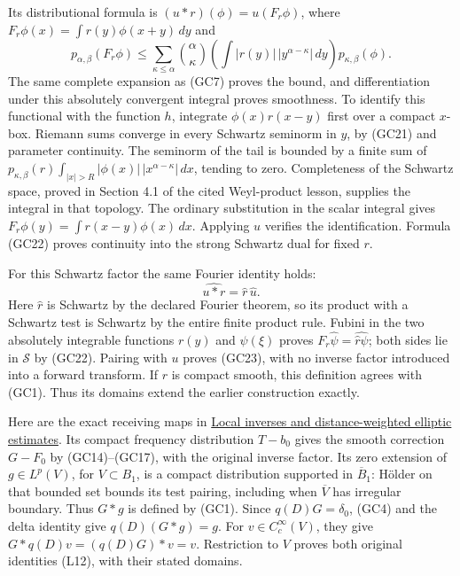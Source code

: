 \documentclass[
  11pt,
]{article}
\begin{document}
Its distributional formula is \((u*r)(\phi)=u(F_r\phi)\), where
\(F_r\phi(x)=\int r(y)\phi(x+y)\,dy\) and \[
 p_{\alpha,\beta}(F_r\phi)
 \leq\sum_{\kappa\leq\alpha}\binom{\alpha}{\kappa}
       \left(\int |r(y)|\,|y^{\alpha-\kappa}|\,dy\right)
                  p_{\kappa,\beta}(\phi).
 \tag{GC22}
\] The same complete expansion as (GC7) proves the bound, and
differentiation under this absolutely convergent integral proves
smoothness. To identify this functional with the function \(h\),
integrate \(\phi(x)r(x-y)\) first over a compact \(x\)-box. Riemann sums
converge in every Schwartz seminorm in \(y\), by (GC21) and parameter
continuity. The seminorm of the tail is bounded by a finite sum of
\(p_{\kappa,\beta}(r)\int_{|x|>R}|\phi(x)|\,|x^{\alpha-\kappa}|\,dx\),
tending to zero. Completeness of the Schwartz space, proved in Section
4.1 of the cited Weyl-product lesson, supplies the integral in that
topology. The ordinary substitution in the scalar integral gives
\(F_r\phi(y)=\int r(x-y)\phi(x)\,dx\). Applying \(u\) verifies the
identification. Formula (GC22) proves continuity into the strong
Schwartz dual for fixed \(r\).

For this Schwartz factor the same Fourier identity holds: \[
 \widehat{u*r}=\widehat r\,\widehat u.
 \tag{GC23}
\] Here \(\widehat r\) is Schwartz by the declared Fourier theorem, so
its product with a Schwartz test is Schwartz by the entire finite
product rule. Fubini in the two absolutely integrable functions \(r(y)\)
and \(\psi(\xi)\) proves \(F_r\widehat\psi=\widehat{\widehat r\psi}\);
both sides lie in \(\mathcal S\) by (GC22). Pairing with \(u\) proves
(GC23), with no inverse factor introduced into a forward transform. If
\(r\) is compact smooth, this definition agrees with (GC1). Thus its
domains extend the earlier construction exactly.

Here are the exact receiving maps in
\href{local-elliptic-coefficients.pdf}{Local inverses and
distance-weighted elliptic estimates}. Its compact frequency
distribution \(T-b_0\) gives the smooth correction \(G-F_0\) by
(GC14)--(GC17), with the original inverse factor. Its zero extension of
\(g\in L^p(V)\), for \(V\subset B_1\), is a compact distribution
supported in \(\overline B_1\): Hölder on that bounded set bounds its
test pairing, including when \(\overline V\) has irregular boundary.
Thus \(G*g\) is defined by (GC1). Since \(q(D)G=\delta_0\), (GC4) and
the delta identity give \(q(D)(G*g)=g\). For \(v\in C_c^\infty(V)\),
they give \(G*q(D)v=(q(D)G)*v=v\). Restriction to \(V\) proves both
original identities (L12), with their stated domains.
\end{document}
